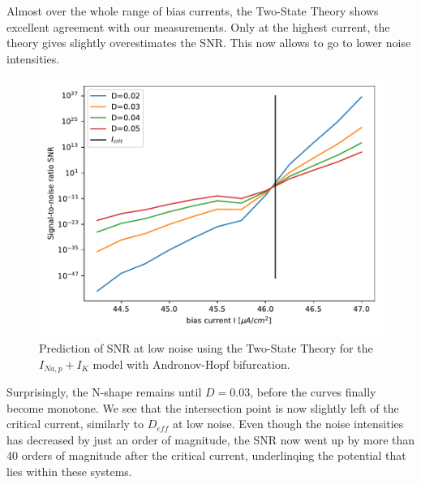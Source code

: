 \documentclass[12pt,a4paper]{article}
\begin{document}
Almost over the whole range of bias currents, the Two-State Theory shows excellent agreement with our measurements. Only at the highest current, the theory gives slightly overestimates the SNR. This now allows to go to lower noise intensities.
\begin{figure}[H]
	\centering
	\includegraphics[scale=1]{snranhopfpred2.pdf}\caption{Prediction of SNR at low noise  using the Two-State Theory for the $I_{Na,p}+I_K$ model with Andronov-Hopf bifurcation.}
	\label{snrpredanhopf}
\end{figure}
Surprisingly, the N-shape remains until $D=0.03$, before the curves finally become monotone. We see that the intersection point is now slightly left of the critical current, similarly to $D_{eff}$ at low noise. Even though the noise intensities has decreased by just an order of magnitude, the SNR now went up by more than 40 orders of magnitude after the critical current, underlinqing the potential that lies within these systems.
\end{document}
